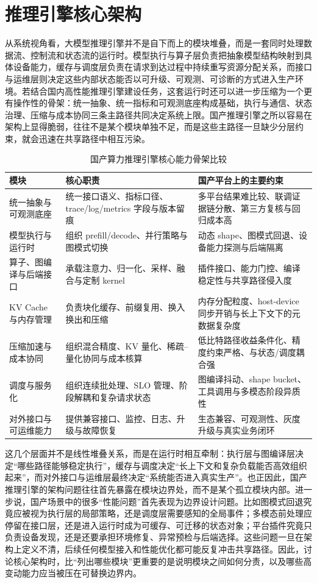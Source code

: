 \section{推理引擎核心架构}

从系统视角看，大模型推理引擎并不是自下而上的模块堆叠，而是一套同时处理数据流、控制流和状态流的运行时。模型执行与算子层负责把抽象模型结构映射到具体设备能力，缓存与调度层负责在请求到达过程中持续重写资源分配关系，而接口与运维层则决定这些内部状态能否以可升级、可观测、可诊断的方式进入生产环境。若结合国内高性能推理引擎建设任务，这套运行时还可以进一步压缩为一个更有操作性的骨架：统一抽象、统一指标和可观测底座构成基础，执行与通信、状态治理、压缩与成本协同三条主路径共同决定系统上限。国产推理引擎之所以容易在架构上显得脆弱，往往不是某个模块单独不足，而是这些主路径一旦缺少分层约束，就会迅速在共享路径中相互污染。

\begin{table}[t]
\centering
\small
\caption{国产算力推理引擎核心能力骨架比较}
\begin{tabularx}{\linewidth}{>{\raggedright\arraybackslash}p{2.7cm}YY}
\toprule
模块 & 核心职责 & 国产平台上的主要约束 \\
\midrule
统一抽象与可观测底座 & 统一接口语义、指标口径、trace/log/metrics 字段与版本留痕 & 多平台结果难比较、联调证据链分散、第三方复核与回归成本高 \\
模型执行与运行时 & 组织 prefill/decode、并行策略与图模式切换 & 动态 shape、图模式回退、设备能力探测与后端隔离 \\
算子、图编译与后端接口 & 承载注意力、归一化、采样、融合与定制 kernel & 插件接口、能力门控、编译稳定性与共享路径侵入度 \\
KV Cache 与内存管理 & 负责块化缓存、前缀复用、换入换出和压缩 & 内存分配粒度、host-device 同步开销与长上下文下的元数据复杂度 \\
压缩加速与成本协同 & 组织混合精度、KV 量化、稀疏--量化协同与成本核算 & 低比特路径收益条件化、精度约束严格、与状态/调度耦合强 \\
调度与服务化 & 组织连续批处理、SLO 管理、阶段解耦和复杂请求状态 & 图编译抖动、shape bucket、工具调用与多模态阶段异质性 \\
对外接口与可运维能力 & 提供兼容接口、监控、日志、升级与故障恢复 & 生态兼容、可观测性、灰度升级与真实业务闭环 \\
\bottomrule
\end{tabularx}
\end{table}

这几个层面并不是线性堆叠关系，而是在运行时相互牵制：执行层与图编译层决定“哪些路径能够稳定执行”，缓存与调度决定“长上下文和复杂负载能否高效组织起来”，而对外接口与运维层最终决定“系统能否进入真实生产”。也正因此，国产推理引擎的架构问题往往首先暴露在模块边界处，而不是某个孤立模块内部。进一步说，国产场景中的很多“性能问题”首先表现为边界设计问题。比如图模式回退究竟应被视为执行层的局部策略，还是调度层需要感知的全局事件；多模态前处理应停留在接口层，还是进入运行时成为可缓存、可迁移的状态对象；平台插件究竟只负责设备发现，还是还要承担环境修复、异常预检与后端选择。这些问题一旦在架构上定义不清，后续任何模型接入和性能优化都可能反复冲击共享路径。因此，讨论核心架构时，比“列出哪些模块”更重要的是说明模块之间如何分责，以及哪些高变动能力应当被压在可替换边界内。


